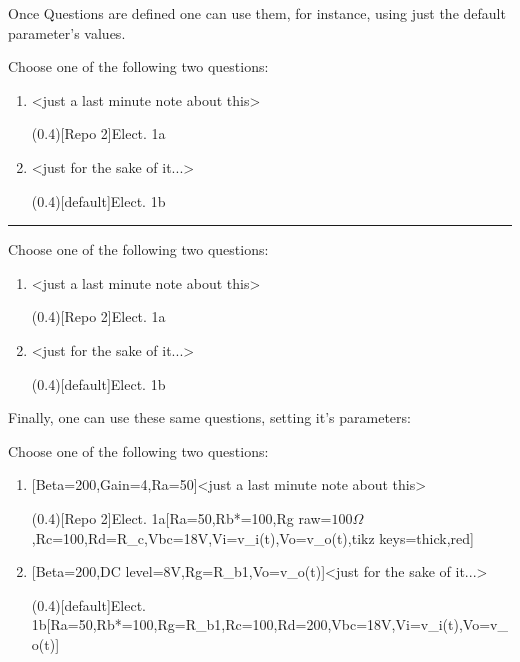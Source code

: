 \documentclass[10pt]{article}
\begin{document}


Once Questions are defined one can use them, for instance, using just the default parameter's values.

\begin{codestore}[QuestionDefault]
Choose one of the following two questions:

\begin{enumerate}
  \item {}<just a last minute note about this>\par
  \ftikzQuestion(0.4)[Repo 2]{Elect. 1a}
  
  \item {}<just for the sake of it...>\par
  \ftikzQuestion(0.4)[default]{Elect. 1b}
\end{enumerate}
\end{codestore}



\hrule\relax\vspace{0.5ex}

Choose one of the following two questions:

\begin{enumerate}
  \item {}<just a last minute note about this>\par
  \ftikzQuestion(0.4)[Repo 2]{Elect. 1a}
  
  \item {}<just for the sake of it...>\par
  \ftikzQuestion(0.4)[default]{Elect. 1b}
\end{enumerate}

Finally, one can use these same questions, setting it's parameters:

\begin{codestore}[QuestionUse]
Choose one of the following two questions:

\begin{enumerate}
  \item {}[Beta=200,Gain=4,Ra=50\Omega]<just a last minute note about this>\par
  \ftikzQuestion(0.4)[Repo 2]{Elect. 1a}[Ra=50\Omega,Rb*=100\Omega,Rg raw=$100\Omega$,Rc=100\Omega,Rd=R_c,Vbc=18V,Vi=v_i(t),Vo=v_o(t),tikz keys={thick,red}] %
  
  \item {}[Beta=200,DC level=8V,Rg=R_{b1},Vo=v_o(t)]<just for the sake of it...>\par
  \ftikzQuestion(0.4)[default]{Elect. 1b}[Ra=50\Omega,Rb*=100\Omega,Rg=R_{b1},Rc=100\Omega,Rd=200\Omega,Vbc=18V,Vi=v_i(t),Vo=v_o(t)]
\end{enumerate}
\end{codestore}
\end{document}
